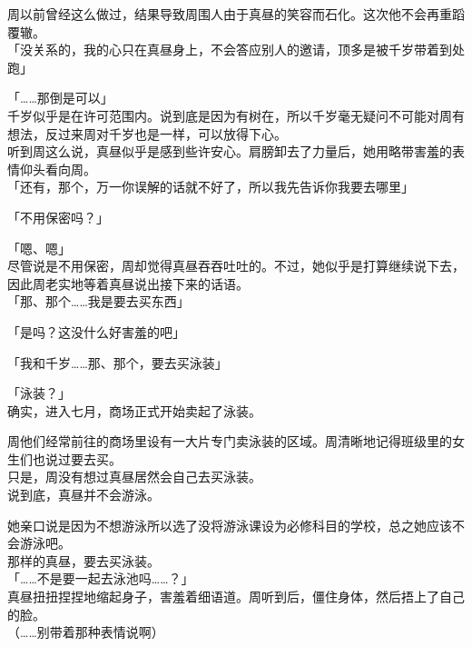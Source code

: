 周以前曾经这么做过，结果导致周围人由于真昼的笑容而石化。这次他不会再重蹈覆辙。\\

「没关系的，我的心只在真昼身上，不会答应别人的邀请，顶多是被千岁带着到处跑」

「……那倒是可以」\\

千岁似乎是在许可范围内。说到底是因为有树在，所以千岁毫无疑问不可能对周有想法，反过来周对千岁也是一样，可以放得下心。\\

听到周这么说，真昼似乎是感到些许安心。肩膀卸去了力量后，她用略带害羞的表情仰头看向周。\\

「还有，那个，万一你误解的话就不好了，所以我先告诉你我要去哪里」

「不用保密吗？」

「嗯、嗯」\\

尽管说是不用保密，周却觉得真昼吞吞吐吐的。不过，她似乎是打算继续说下去，因此周老实地等着真昼说出接下来的话语。\\

「那、那个……我是要去买东西」

「是吗？这没什么好害羞的吧」

「我和千岁……那、那个，要去买泳装」

「泳装？」\\

确实，进入七月，商场正式开始卖起了泳装。

周他们经常前往的商场里设有一大片专门卖泳装的区域。周清晰地记得班级里的女生们也说过要去买。\\

只是，周没有想过真昼居然会自己去买泳装。\\

说到底，真昼并不会游泳。

她亲口说是因为不想游泳所以选了没将游泳课设为必修科目的学校，总之她应该不会游泳吧。\\

那样的真昼，要去买泳装。\\

「……不是要一起去泳池吗……？」\\

真昼扭扭捏捏地缩起身子，害羞着细语道。周听到后，僵住身体，然后捂上了自己的脸。\\

（……别带着那种表情说啊）\\

